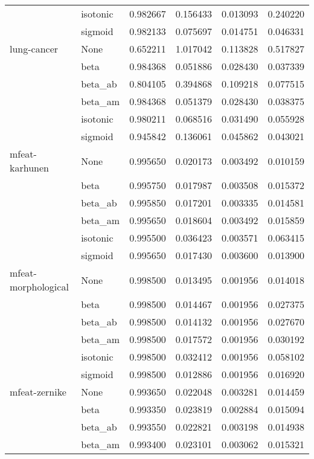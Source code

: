 \begin{tabular}{llrrrr}
        & isotonic &  0.982667 &  0.156433 &  0.013093 &  0.240220 \\
        & sigmoid &  0.982133 &  0.075697 &  0.014751 &  0.046331 \\
lung-cancer & None &  0.652211 &  1.017042 &  0.113828 &  0.517827 \\
        & beta &  0.984368 &  0.051886 &  0.028430 &  0.037339 \\
        & beta\_ab &  0.804105 &  0.394868 &  0.109218 &  0.077515 \\
        & beta\_am &  0.984368 &  0.051379 &  0.028430 &  0.038375 \\
        & isotonic &  0.980211 &  0.068516 &  0.031490 &  0.055928 \\
        & sigmoid &  0.945842 &  0.136061 &  0.045862 &  0.043021 \\
mfeat-karhunen & None &  0.995650 &  0.020173 &  0.003492 &  0.010159 \\
        & beta &  0.995750 &  0.017987 &  0.003508 &  0.015372 \\
        & beta\_ab &  0.995850 &  0.017201 &  0.003335 &  0.014581 \\
        & beta\_am &  0.995650 &  0.018604 &  0.003492 &  0.015859 \\
        & isotonic &  0.995500 &  0.036423 &  0.003571 &  0.063415 \\
        & sigmoid &  0.995650 &  0.017430 &  0.003600 &  0.013900 \\
mfeat-morphological & None &  0.998500 &  0.013495 &  0.001956 &  0.014018 \\
        & beta &  0.998500 &  0.014467 &  0.001956 &  0.027375 \\
        & beta\_ab &  0.998500 &  0.014132 &  0.001956 &  0.027670 \\
        & beta\_am &  0.998500 &  0.017572 &  0.001956 &  0.030192 \\
        & isotonic &  0.998500 &  0.032412 &  0.001956 &  0.058102 \\
        & sigmoid &  0.998500 &  0.012886 &  0.001956 &  0.016920 \\
mfeat-zernike & None &  0.993650 &  0.022048 &  0.003281 &  0.014459 \\
        & beta &  0.993350 &  0.023819 &  0.002884 &  0.015094 \\
        & beta\_ab &  0.993550 &  0.022821 &  0.003198 &  0.014938 \\
        & beta\_am &  0.993400 &  0.023101 &  0.003062 &  0.015321 \\

\end{tabular}
